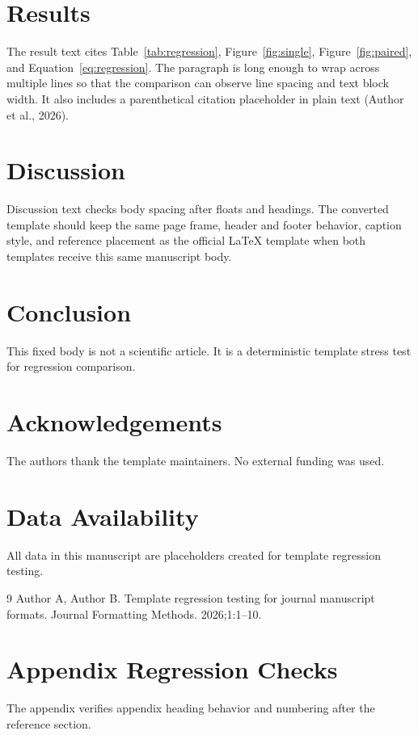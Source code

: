 \section{Results}
The result text cites Table~\ref{tab:regression}, Figure~\ref{fig:single}, Figure~\ref{fig:paired}, and Equation~\ref{eq:regression}. The paragraph is long enough to wrap across multiple lines so that the comparison can observe line spacing and text block width. It also includes a parenthetical citation placeholder in plain text (Author et al., 2026).

\section{Discussion}
Discussion text checks body spacing after floats and headings. The converted template should keep the same page frame, header and footer behavior, caption style, and reference placement as the official LaTeX template when both templates receive this same manuscript body.

\section{Conclusion}
This fixed body is not a scientific article. It is a deterministic template stress test for regression comparison.

\section*{Acknowledgements}
The authors thank the template maintainers. No external funding was used.

\section*{Data Availability}
All data in this manuscript are placeholders created for template regression testing.

\begin{thebibliography}{9}
Author A, Author B. Template regression testing for journal manuscript formats. Journal Formatting Methods. 2026;1:1--10.
\end{thebibliography}

\appendix
\section{Appendix Regression Checks}
The appendix verifies appendix heading behavior and numbering after the reference section.
